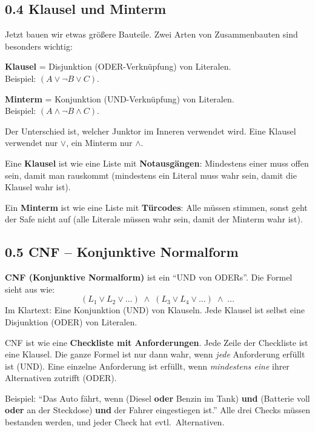 \documentclass[a4paper,12pt]{article}
\begin{document}
\subsection*{0.4 Klausel und Minterm}

Jetzt bauen wir etwas gr\"o{\ss}ere Bauteile. Zwei Arten von
Zusammenbauten sind besonders wichtig:

\begin{merkbox}
\textbf{Klausel} = Disjunktion (ODER-Verkn\"upfung) von Literalen.\\
Beispiel: $(A \vee \neg B \vee C)$.

\medskip
\textbf{Minterm} = Konjunktion (UND-Verkn\"upfung) von Literalen.\\
Beispiel: $(A \wedge \neg B \wedge C)$.
\end{merkbox}

Der Unterschied ist, welcher Junktor im Inneren verwendet wird. Eine
Klausel verwendet nur $\vee$, ein Minterm nur $\wedge$.

\begin{analogie}
Eine \textbf{Klausel} ist wie eine Liste mit \textbf{Notausg\"angen}:
Mindestens einer muss offen sein, damit man rauskommt (mindestens ein
Literal muss wahr sein, damit die Klausel wahr ist).

\medskip
Ein \textbf{Minterm} ist wie eine Liste mit \textbf{T\"urcodes}: Alle
m\"ussen stimmen, sonst geht der Safe nicht auf (alle Literale
m\"ussen wahr sein, damit der Minterm wahr ist).
\end{analogie}

\subsection*{0.5 CNF -- Konjunktive Normalform}

\begin{merkbox}
\textbf{CNF (Konjunktive Normalform)} ist ein "`UND von ODERs"'. Die
Formel sieht aus wie:
\[
(L_1 \vee L_2 \vee \dots) \;\wedge\; (L_3 \vee L_4 \vee \dots)
  \;\wedge\; \dots
\]
Im Klartext: Eine Konjunktion (UND) von Klauseln. Jede Klausel ist
selbst eine Disjunktion (ODER) von Literalen.
\end{merkbox}

\begin{analogie}
CNF ist wie eine \textbf{Checkliste mit Anforderungen}. Jede Zeile
der Checkliste ist eine Klausel. Die ganze Formel ist nur dann wahr,
wenn \emph{jede} Anforderung erf\"ullt ist (UND). Eine einzelne
Anforderung ist erf\"ullt, wenn \emph{mindestens eine} ihrer
Alternativen zutrifft (ODER).

\medskip
Beispiel: "`Das Auto f\"ahrt, wenn (Diesel \textbf{oder} Benzin im
Tank) \textbf{und} (Batterie voll \textbf{oder} an der Steckdose)
\textbf{und} der Fahrer eingestiegen ist."' Alle drei Checks m\"ussen
bestanden werden, und jeder Check hat evtl.\ Alternativen.
\end{analogie}
\end{document}
